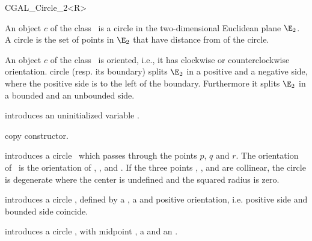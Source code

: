 

\begin {classtemplate} {CGAL_Circle_2<R>}

  An object $c$ of the class \classname\ is a circle 
in the two-dimensional Euclidean plane $\E_2$. 
A circle is the set of points in $\E_2$ that have distance
 from 
of the circle.

An object $c$ of the class \classname\ is oriented, i.e., it has
clockwise or counterclockwise orientation.
circle (resp. its boundary) splits $\E_2$ in a positive and a negative side,
where the positive side is to the left of the boundary.
Furthermore it splits $\E_2$ in a bounded and an unbounded side. 


\creation
{}


\hidden {}
             {introduces an uninitialized variable \var.}

\hidden {}
 	    {copy constructor.}


\def\CCalternateThreeColumn{\CCtrue}
            {introduces a circle \var\ which passes through the points
              $p$,  $q$ and $r$. The orientation of \var\ is the orientation
              of , , and . If the three points
              , , and  are collinear, the 
              circle is degenerate where the center is undefined and the 
              squared radius is zero.}

            {introduces a circle \var, defined by a ,
	     a   and positive orientation, i.e.
             positive side and bounded side coincide.}

            {introduces a circle \var, with midpoint , 
	     a  and an  .}


\end{classtemplate}
